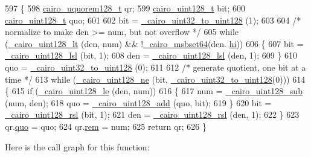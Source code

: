 \begin{DoxyCode}
597 \{
598     \hyperlink{struct__cairo__uquorem128}{cairo\_uquorem128\_t}        qr;
599     \hyperlink{structcairo__uint128}{cairo\_uint128\_t}      bit;
600     \hyperlink{structcairo__uint128}{cairo\_uint128\_t}      quo;
601 
602     bit = \hyperlink{cairo-wideint_8c_a23416e4346eb40467a88a873acc55057}{\_cairo\_uint32\_to\_uint128} (1);
603 
604     \textcolor{comment}{/* normalize to make den >= num, but not overflow */}
605     \textcolor{keywordflow}{while} (\hyperlink{cairo-wideint_8c_aa7f16a7219ad7534bf766af26589de40}{\_cairo\_uint128\_lt} (den, num) && !\hyperlink{cairo-wideint_8c_a53f1e9646f6581881ca79a896f8dc37b}{\_cairo\_msbset64}(den.
      \hyperlink{structcairo__uint128_a86857a1c12a574ee089c60330ea0a86c}{hi}))
606     \{
607         bit = \hyperlink{cairo-wideint_8c_a0dcc5a4047b43752da4c9a6acd959903}{\_cairo\_uint128\_lsl} (bit, 1);
608         den = \hyperlink{cairo-wideint_8c_a0dcc5a4047b43752da4c9a6acd959903}{\_cairo\_uint128\_lsl} (den, 1);
609     \}
610     quo = \hyperlink{cairo-wideint_8c_a23416e4346eb40467a88a873acc55057}{\_cairo\_uint32\_to\_uint128} (0);
611 
612     \textcolor{comment}{/* generate quotient, one bit at a time */}
613     \textcolor{keywordflow}{while} (\hyperlink{cairo-wideint-private_8h_a6c94458c89a84b24b5b627b7433c2b9c}{\_cairo\_uint128\_ne} (bit, \hyperlink{cairo-wideint_8c_a23416e4346eb40467a88a873acc55057}{\_cairo\_uint32\_to\_uint128}(0)))
614     \{
615         \textcolor{keywordflow}{if} (\hyperlink{cairo-wideint-private_8h_a793ff8c04e492e95aa7eccb440c34b43}{\_cairo\_uint128\_le} (den, num))
616         \{
617             num = \hyperlink{cairo-wideint_8c_a4ac7f020e382247e3693fb1597e41fdf}{\_cairo\_uint128\_sub} (num, den);
618             quo = \hyperlink{cairo-wideint_8c_ac5ea95d722e772cbae83ad6659a629fe}{\_cairo\_uint128\_add} (quo, bit);
619         \}
620         bit = \hyperlink{cairo-wideint_8c_a6591001de314b365318db0edc7950fde}{\_cairo\_uint128\_rsl} (bit, 1);
621         den = \hyperlink{cairo-wideint_8c_a6591001de314b365318db0edc7950fde}{\_cairo\_uint128\_rsl} (den, 1);
622     \}
623     qr.\hyperlink{struct__cairo__uquorem128_aaa67cc24ac0c9ad1fb97f732187a0ab2}{quo} = quo;
624     qr.\hyperlink{struct__cairo__uquorem128_a7a964e22b58920045458c6a528791cbc}{rem} = num;
625     \textcolor{keywordflow}{return} qr;
626 \}
\end{DoxyCode}


Here is the call graph for this function\+:




